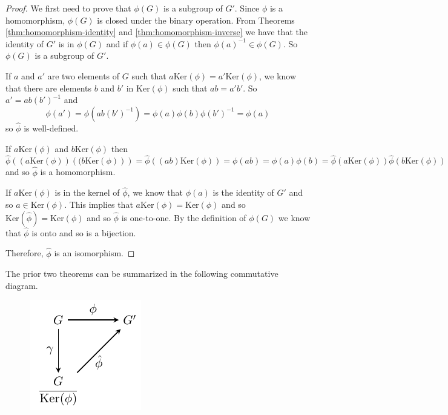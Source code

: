 \documentclass[
]{book}
\theoremstyle{definition}
\theoremstyle{definition}
\theoremstyle{definition}
\theoremstyle{definition}
\theoremstyle{remark}
\begin{document}
\begin{proof}

We first need to prove that \(\phi(G)\) is a subgroup of \(G'\). Since \(\phi\) is a homomorphism, \(\phi(G)\) is closed under the binary operation. From Theorems \ref{thm:homomorphism-identity} and \ref{thm:homomorphism-inverse} we have that the identity of \(G'\) is in \(\phi(G)\) and if \(\phi(a)\in \phi(G)\) then \(\phi(a)^{-1}\in \phi(G)\). So \(\phi(G)\) is a subgroup of \(G'\).

If \(a\) and \(a'\) are two elements of \(G\) such that \(a \mbox{Ker}(\phi) = a' \mbox{Ker}(\phi)\), we know that there are elements \(b\) and \(b'\) in \(\mbox{Ker}(\phi)\) such that \(a b = a' b'\). So \(a'= ab (b')^{-1}\) and \[\phi(a') = \phi(ab (b')^{-1}) = \phi(a) \phi(b) \phi(b')^{-1} = \phi(a)\] so \(\hat{\phi}\) is well-defined.

If \(a \mbox{Ker}(\phi)\) and \(b \mbox{Ker}(\phi)\) then \[\hat{\phi} \left( \left(a \mbox{Ker}(\phi) \right) \left((b \mbox{Ker}(\phi)\right) \right) = \hat{\phi} \left( (ab) \mbox{Ker}(\phi) \right) = \phi(ab) = \phi(a) \phi(b) = \hat{\phi}\left( a \mbox{Ker}(\phi)\right) \hat{\phi} \left(b \mbox{Ker}(\phi)\right)\] and so \(\hat{\phi}\) is a homomorphism.

If \(a \mbox{Ker}(\phi)\) is in the kernel of \(\hat{\phi}\), we know that \(\phi(a)\) is the identity of \(G'\) and so \(a\in \mbox{Ker}(\phi)\). This implies that \(a \mbox{Ker}(\phi)= \mbox{Ker}(\phi)\) and so \(\mbox{Ker}(\hat{\phi}) = \mbox{Ker}(\phi)\) and so \(\hat{\phi}\) is one-to-one. By the definition of \(\phi(G)\) we know that \(\hat{\phi}\) is onto and so is a bijection.

Therefore, \(\hat{\phi}\) is an isomorphism.

\end{proof}

The prior two theorems can be summarized in the following commutative diagram.

\begin{figure}

{\centering \includegraphics[width=0.2\linewidth]{tikz/homomorphism_commutative_diagram} 

}

\end{figure}
\end{document}
